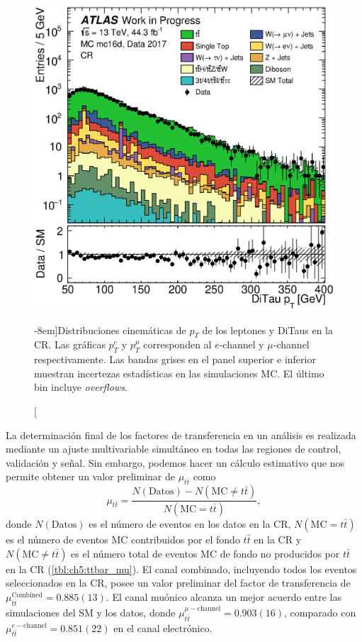 \begin{figure}[t]
\begin{minipage}{0.91\fulllinewidth}
        \includegraphics[width=\individualPlotWidth]{Assets/Plots/withData/h_stack_mc16d_data17_ditau_pt.eps}
    \end{minipage}

    \caption[][-8em]{Distribuciones cinemáticas de $p_T$ de los leptones y DiTaus en la CR. Las gráficas $p_T^e$ y $p_T^\mu$ corresponden al $e$-channel y $\mu$-channel respectivamente. Las bandas grises en el panel superior e inferior muestran incertezas estadísticas en las simulaciones MC. El último bin incluye \textit{overflows}.}
    \label{fig:ch5:h_results}
\end{figure}

La determinación final de los factores de transferencia en un análisis es realizada mediante un ajuste multivariable simultáneo en todas las regiones de control, validación y señal. Sin embargo, podemos hacer un cálculo estimativo que nos permite obtener un valor preliminar de $\mu_{t\bar{t}}$ como
\[ \mu_{t\bar{t}} = \frac{N(\text{Datos}) - N(\text{MC} \neq t\bar{t})}{N(\text{MC} = t\bar{t})}, \]
donde $N(\text{Datos})$ es el número de eventos en los datos en la CR, $N(\text{MC} = t\bar{t})$ es el número de eventos MC contribuidos por el fondo $t\bar{t}$ en la CR y $N(\text{MC} \neq t\bar{t})$ es el número total de eventos MC de fondo no producidos por $t\bar{t}$ en la CR (\cref{tbl:ch5:ttbar_mu}). El canal combinado, incluyendo todos los eventos seleccionados en la CR, posee un valor preliminar del factor de transferencia de $\mu_{t\bar{t}}^{\text{Combined}} = 0.885(13)$. El canal muónico alcanza un mejor acuerdo entre las simulaciones del SM y los datos, donde $\mu_{t\bar{t}}^{\mu-\text{channel}} = 0.903(16)$, comparado con $\mu_{t\bar{t}}^{e-\text{channel}} = 0.851(22)$ en el canal electrónico.

